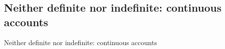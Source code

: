 \subsection{Neither definite nor indefinite: continuous accounts} 

Neither definite nor indefinite: continuous accounts





